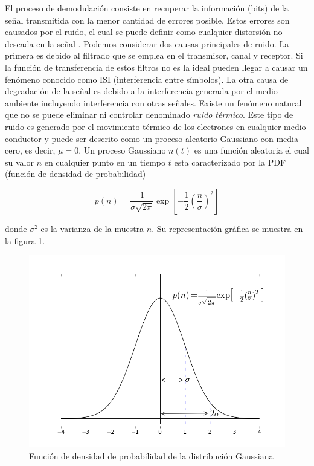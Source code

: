 El proceso de demodulaci\'on consiste en recuperar la informaci\'on (bits) de la se\~nal
transmitida con la menor cantidad de errores posible. Estos errores son causados por el ruido, el
cual se puede definir como cualquier distorsi\'on no deseada en la se\~nal \cite{sklar}. Podemos considerar dos
causas principales de ruido. La primera es debido al filtrado que se emplea en el transmisor, canal
y receptor. Si la funci\'on de transferencia de estos filtros no es la ideal pueden llegar a causar
un fen\'omeno conocido como ISI (interferencia entre s\'imbolos). La otra causa de degradaci\'on de
la se\~nal es debido a la interferencia generada por el medio ambiente incluyendo interferencia con
otras se\~nales. Existe un fen\'omeno natural que no se puede eliminar ni controlar denominado
\emph{ruido t\'ermico}. Este tipo de ruido es generado por el movimiento t\'ermico de los electrones
en cualquier medio conductor y puede ser descrito como un proceso aleatorio Gaussiano con media cero, es decir, $\mu=0$. Un
proceso Gaussiano $n(t)$ es una funci\'on aleatoria el cual su valor $n$ en cualquier punto en un tiempo $t$ esta
caracterizado por la PDF (funci\'on de densidad de probabilidad)

\begin{equation}\label{eq:gauss}
p(n)=\frac{1}{\sigma\sqrt{2\pi}}\exp\left[-\frac{1}{2}\left(\frac{n}{\sigma}\right)^2\right]
\end{equation}

donde $\sigma^2$ es la varianza de la muestra $n$. Su representaci\'on gr\'afica se muestra en la figura \ref{fig:gauss}.

\begin{figure}[ht]
\centering
	\includegraphics[width=5.5in]{figs/gauss}
	\caption{Funci\'on de densidad de probabilidad de la distribuci\'on Gaussiana \protect\cite{sklar}}
	\label{fig:gauss}
\end{figure}

